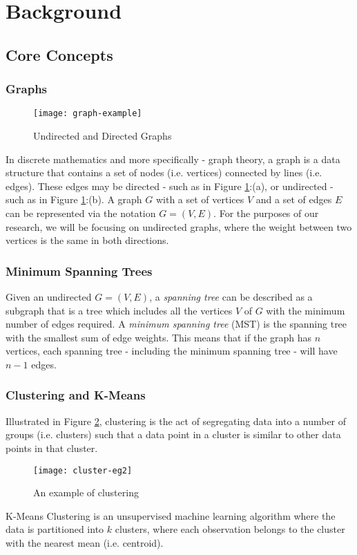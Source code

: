 \documentclass[a4paper,11pt]{article}
\begin{document}
\newpage
\section{Background}
\subsection{Core Concepts} %
\subsubsection*{Graphs}
\begin{figure}[H]
\centering
\texttt{[image: graph-example]}
\caption{Undirected and Directed Graphs}
\label{fig:graph.example}
\end{figure}
In discrete mathematics and more specifically - graph theory, a graph is a data structure that contains a set of nodes (i.e. vertices) connected by lines (i.e. edges).  These edges may be directed - such as in Figure \ref{fig:graph.example}:(a), or undirected - such as in Figure \ref{fig:graph.example}:(b). A graph $G$ with a set of vertices $V$ and a set of edges $E$ can be represented via the notation $G = (V,E)$. For the purposes of our research, we will be focusing on undirected graphs, where the weight between two vertices is the same in both directions.
\subsubsection{Minimum Spanning Trees}
Given an undirected $G = (V,E)$,  a \textit{spanning tree} can be described as a subgraph that is a tree which includes all the vertices $V$ of $G$ with the minimum number of edges required. A \textit{minimum spanning tree} (MST) is the spanning tree with the smallest sum of edge weights.  This means that if the graph has $n$ vertices, each spanning tree - including the minimum spanning tree - will have $n-1$ edges.
\subsubsection{Clustering and K-Means}
Illustrated in Figure \ref{fig:clustering-eg}, clustering is the act of segregating data into a number of groups (i.e. clusters) such that a data point in a cluster is similar to other data points in that cluster.
\begin{figure}[H]
\centering
\texttt{[image: cluster-eg2]}
\caption{An example of clustering}\label{fig:clustering-eg}
\end{figure}
\noindent K-Means Clustering \cite{kmeans} is an unsupervised machine learning algorithm where the data is partitioned into $k$ clusters, where each observation belongs to the cluster with the nearest mean (i.e. centroid).
\end{document}
